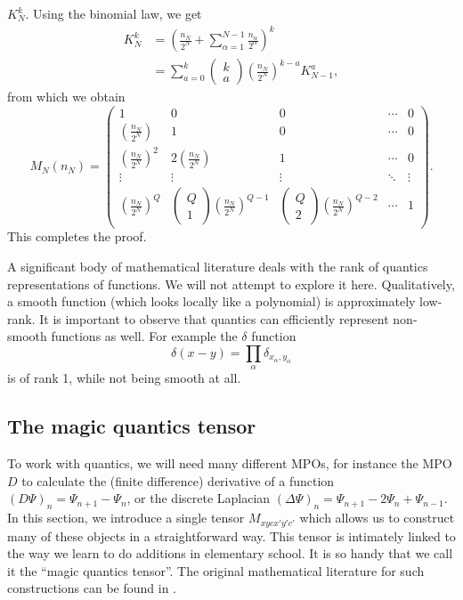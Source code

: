 \documentclass{SciPost}
\begin{document}
$K_N^k$. Using the binomial law, we get
\begin{align}
K_N^k &= \left( \frac{n_N}{2^{N}} + \sum_{\alpha=1}^{N-1} \frac{n_\alpha}{2^{\alpha}} \right)^k \nonumber \\
&= \sum_{a=0}^k
\begin{pmatrix} k \\ a \end{pmatrix}
\left( \frac{n_N}{2^{N}}\right)^{k-a} K_{N-1}^a,
\end{align}
from which we obtain
\begin{equation}
M_N(n_N) =
\begin{pmatrix}
1 & 0 & 0 & \cdots & 0 \\
\left( \frac{n_N}{2^{N}}\right) & 1 & 0 & \cdots & 0 \\
\left( \frac{n_N}{2^{N}}\right)^2 & 2\left( \frac{n_N}{2^{N}}\right) & 1  & \cdots & 0 \\
\vdots & \vdots & \vdots & \ddots & \vdots\\
\left( \frac{n_N}{2^{N}}\right)^{Q} &
\begin{pmatrix} Q\\ 1 \end{pmatrix} \left( \frac{n_N}{2^{N}}\right)^{Q-1} &
\begin{pmatrix} Q \\ 2 \end{pmatrix} \left( \frac{n_N}{2^{N}}\right)^{Q-2} &
\cdots &
1
\end{pmatrix}.
\end{equation}
This completes the proof.

A significant body of mathematical literature deals with the rank of quantics representations of functions. We will not attempt to explore it here. Qualitatively, a smooth function (which looks locally like a polynomial) is approximately low-rank. It is important to observe that quantics can efficiently represent non-smooth functions as well. For example the $\delta$ function
\begin{equation}
\delta(x-y) = \prod_\alpha \delta_{x_\alpha,y_\alpha}
\end{equation}
is of rank 1, while not being smooth at all.

\subsection{The magic quantics tensor}
To work with quantics, we will need many different MPOs, for instance the MPO $D$ to calculate the (finite difference) derivative of a function $(D\Psi)_n = \Psi_{n+1}-\Psi_n$, or the discrete Laplacian $(\Delta\Psi)_n = \Psi_{n+1}-2\Psi_n+\Psi_{n-1}$. In this section, we introduce a single tensor $M_{xycx'y'c'}$ which allows us to construct many of these objects in a straightforward way. This tensor is intimately linked to the way we learn to do additions in elementary school. It is so handy that we call it the ``magic quantics tensor''. The original mathematical literature for such constructions can be found in
\cite{kazeev2012,kazeev2013,kazeev2013b,roberts2014}.
\end{document}
